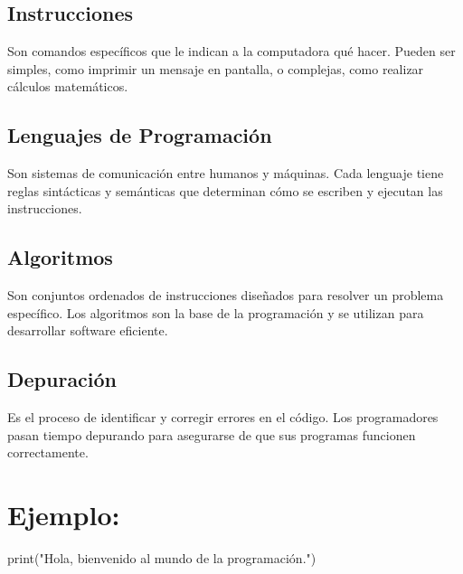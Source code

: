 \documentclass[
  a4paper,
  onepage,
  openany]{scrreprt}
\newenvironment{Shaded}{\begin{snugshade}}{\end{snugshade}}
\newcommand{\BuiltInTok}[1]{\textcolor[rgb]{0.00,0.23,0.31}{#1}}
\newcommand{\NormalTok}[1]{\textcolor[rgb]{0.00,0.23,0.31}{#1}}
\newcommand{\StringTok}[1]{\textcolor[rgb]{0.13,0.47,0.30}{#1}}
\newcommand*\circled[1]{\tikz[baseline=(char.base)]{
          \node[shape=circle,draw,inner sep=1pt] (char) {{\scriptsize#1}};}}
\begin{document}
\hypertarget{instrucciones-1}{%
\subsection{Instrucciones}\label{instrucciones-1}}

Son comandos específicos que le indican a la computadora qué hacer.
Pueden ser simples, como imprimir un mensaje en pantalla, o complejas,
como realizar cálculos matemáticos.

\hypertarget{lenguajes-de-programaciuxf3n-1}{%
\subsection{Lenguajes de
Programación}\label{lenguajes-de-programaciuxf3n-1}}

Son sistemas de comunicación entre humanos y máquinas. Cada lenguaje
tiene reglas sintácticas y semánticas que determinan cómo se escriben y
ejecutan las instrucciones.

\hypertarget{algoritmos-1}{%
\subsection{Algoritmos}\label{algoritmos-1}}

Son conjuntos ordenados de instrucciones diseñados para resolver un
problema específico. Los algoritmos son la base de la programación y se
utilizan para desarrollar software eficiente.

\hypertarget{depuraciuxf3n-1}{%
\subsection{Depuración}\label{depuraciuxf3n-1}}

Es el proceso de identificar y corregir errores en el código. Los
programadores pasan tiempo depurando para asegurarse de que sus
programas funcionen correctamente.

\hypertarget{ejemplo-1}{%
\section{Ejemplo:}\label{ejemplo-1}}

\hypertarget{annotated-cell-2}{%
\label{annotated-cell-2}}%
\begin{Shaded}
\begin{Highlighting}[]
\BuiltInTok{print}\NormalTok{(}\StringTok{"Hola, bienvenido al mundo de la programación."}\NormalTok{) }\hspace*{\fill}\NormalTok{\circled{1}}
\end{Highlighting}
\end{Shaded}
\end{document}
